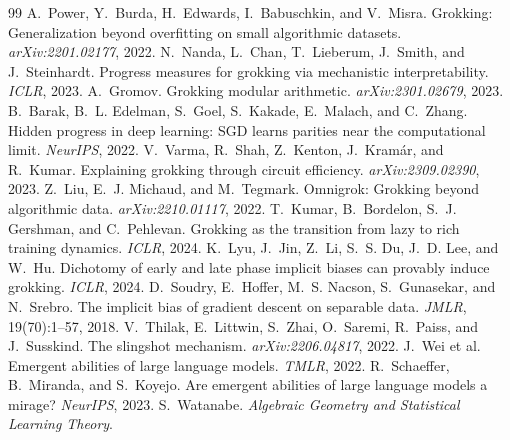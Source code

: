 \documentclass[10pt,twocolumn]{article}
\begin{document}
\small

\begin{thebibliography}{99}
A.~Power, Y.~Burda, H.~Edwards, I.~Babuschkin, and V.~Misra.
\newblock Grokking: Generalization beyond overfitting on small algorithmic datasets.
\newblock \emph{arXiv:2201.02177}, 2022.
N.~Nanda, L.~Chan, T.~Lieberum, J.~Smith, and J.~Steinhardt.
\newblock Progress measures for grokking via mechanistic interpretability.
\newblock \emph{ICLR}, 2023.
A.~Gromov.
\newblock Grokking modular arithmetic.
\newblock \emph{arXiv:2301.02679}, 2023.
B.~Barak, B.~L. Edelman, S.~Goel, S.~Kakade, E.~Malach, and C.~Zhang.
\newblock Hidden progress in deep learning: SGD learns parities near the computational limit.
\newblock \emph{NeurIPS}, 2022.
V.~Varma, R.~Shah, Z.~Kenton, J.~Kram\'ar, and R.~Kumar.
\newblock Explaining grokking through circuit efficiency.
\newblock \emph{arXiv:2309.02390}, 2023.
Z.~Liu, E.~J. Michaud, and M.~Tegmark.
\newblock Omnigrok: Grokking beyond algorithmic data.
\newblock \emph{arXiv:2210.01117}, 2022.
T.~Kumar, B.~Bordelon, S.~J. Gershman, and C.~Pehlevan.
\newblock Grokking as the transition from lazy to rich training dynamics.
\newblock \emph{ICLR}, 2024.
K.~Lyu, J.~Jin, Z.~Li, S.~S. Du, J.~D. Lee, and W.~Hu.
\newblock Dichotomy of early and late phase implicit biases can provably induce grokking.
\newblock \emph{ICLR}, 2024.
D.~Soudry, E.~Hoffer, M.~S. Nacson, S.~Gunasekar, and N.~Srebro.
\newblock The implicit bias of gradient descent on separable data.
\newblock \emph{JMLR}, 19(70):1--57, 2018.
V.~Thilak, E.~Littwin, S.~Zhai, O.~Saremi, R.~Paiss, and J.~Susskind.
\newblock The slingshot mechanism.
\newblock \emph{arXiv:2206.04817}, 2022.
J.~Wei et al.
\newblock Emergent abilities of large language models.
\newblock \emph{TMLR}, 2022.
R.~Schaeffer, B.~Miranda, and S.~Koyejo.
\newblock Are emergent abilities of large language models a mirage?
\newblock \emph{NeurIPS}, 2023.
S.~Watanabe.
\newblock \emph{Algebraic Geometry and Statistical Learning Theory}.

\end{thebibliography}
\end{document}
